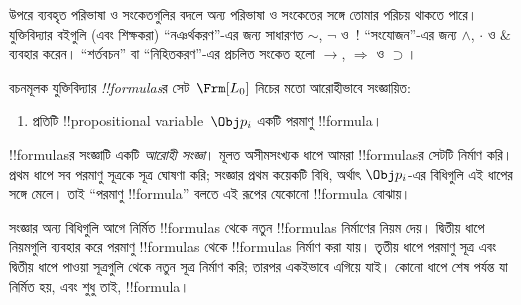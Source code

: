 \documentclass[../../../include/open-logic-section]{subfiles}
\begin{document}

\begin{intro}
উপরে ব্যবহৃত পরিভাষা ও সংকেতগুলির বদলে অন্য পরিভাষা ও সংকেতের সঙ্গে তোমার
পরিচয় থাকতে পারে। যুক্তিবিদ্যার বইগুলি (এবং শিক্ষকরা) “নঞর্থকরণ”-এর জন্য
সাধারণত $\sim$, $\neg$ ও~!\; “সংযোজন”-এর জন্য $\wedge$, $\cdot$ ও $\&$
ব্যবহার করেন। “শর্তবচন” বা “নিহিতকরণ”-এর প্রচলিত সংকেত হলো
$\rightarrow$, $\Rightarrow$ ও $\supset$।
\end{intro}

\begin{defn}[সূত্র]
বচনমূলক যুক্তিবিদ্যার \emph{!!{formula}s}র সেট~$\Frm[L_0]$
নিচের মতো আরোহীভাবে সংজ্ঞায়িত:
\begin{enumerate}


\item প্রতিটি !!{propositional variable}~$\Obj p_i$ একটি পরমাণু
  !!{formula}।






\end{enumerate}
\end{defn}

\begin{explain}
!!{formula}sর সংজ্ঞাটি একটি
\emph{আরোহী সংজ্ঞা}। মূলত অসীমসংখ্যক ধাপে আমরা
!!{formula}sর সেটটি নির্মাণ করি। প্রথম ধাপে সব পরমাণু সূত্রকে সূত্র
ঘোষণা করি; সংজ্ঞার প্রথম কয়েকটি বিধি, অর্থাৎ
%
%
$\Obj p_i$-এর বিধিগুলি এই ধাপের সঙ্গে মেলে। তাই “পরমাণু !!{formula}”
বলতে এই রূপের যেকোনো !!{formula} বোঝায়।

সংজ্ঞার অন্য বিধিগুলি আগে নির্মিত !!{formula}s থেকে নতুন
!!{formula}s নির্মাণের নিয়ম দেয়। দ্বিতীয় ধাপে নিয়মগুলি ব্যবহার করে
পরমাণু !!{formula}s থেকে !!{formula}s নির্মাণ করা যায়। তৃতীয় ধাপে
পরমাণু সূত্র এবং দ্বিতীয় ধাপে পাওয়া সূত্রগুলি থেকে নতুন সূত্র নির্মাণ করি;
তারপর একইভাবে এগিয়ে যাই। কোনো ধাপে শেষ পর্যন্ত যা নির্মিত হয়, এবং শুধু
তাই, !!{formula}।
\end{explain}
\end{document}
